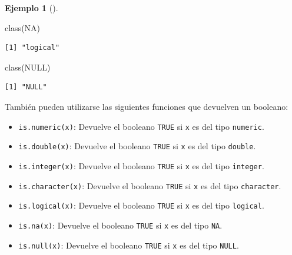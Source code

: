 \documentclass[
  a4paper,
]{scrreport}
\newenvironment{Shaded}{\begin{snugshade}}{\end{snugshade}}
\newcommand{\ConstantTok}[1]{\textcolor[rgb]{0.56,0.35,0.01}{#1}}
\newcommand{\FunctionTok}[1]{\textcolor[rgb]{0.28,0.35,0.67}{#1}}
\newcommand{\NormalTok}[1]{\textcolor[rgb]{0.00,0.23,0.31}{#1}}
\providecommand{\tightlist}{%
  \setlength{\itemsep}{0pt}\setlength{\parskip}{0pt}}\usepackage{longtable,booktabs,array}
\theoremstyle{definition}
\theoremstyle{definition}
\newtheorem{example}{Ejemplo}[chapter]
\theoremstyle{remark}
\begin{document}
\begin{example}[]
\begin{Shaded}
\begin{Highlighting}[]
\FunctionTok{class}\NormalTok{(}\ConstantTok{NA}\NormalTok{)}
\end{Highlighting}
\end{Shaded}

\begin{verbatim}
[1] "logical"
\end{verbatim}

\begin{Shaded}
\begin{Highlighting}[]
\FunctionTok{class}\NormalTok{(}\ConstantTok{NULL}\NormalTok{)}
\end{Highlighting}
\end{Shaded}

\begin{verbatim}
[1] "NULL"
\end{verbatim}

\end{example}

También pueden utilizarse las siguientes funciones que devuelven un
booleano:

\begin{itemize}
\tightlist
\item
  \texttt{is.numeric(x)}: Devuelve el booleano \texttt{TRUE} si
  \texttt{x} es del tipo \texttt{numeric}.
\item
  \texttt{is.double(x)}: Devuelve el booleano \texttt{TRUE} si
  \texttt{x} es del tipo \texttt{double}.
\item
  \texttt{is.integer(x)}: Devuelve el booleano \texttt{TRUE} si
  \texttt{x} es del tipo \texttt{integer}.
\item
  \texttt{is.character(x)}: Devuelve el booleano \texttt{TRUE} si
  \texttt{x} es del tipo \texttt{character}.
\item
  \texttt{is.logical(x)}: Devuelve el booleano \texttt{TRUE} si
  \texttt{x} es del tipo \texttt{logical}.
\item
  \texttt{is.na(x)}: Devuelve el booleano \texttt{TRUE} si \texttt{x} es
  del tipo \texttt{NA}.
\item
  \texttt{is.null(x)}: Devuelve el booleano \texttt{TRUE} si \texttt{x}
  es del tipo \texttt{NULL}.
\end{itemize}
\end{document}
